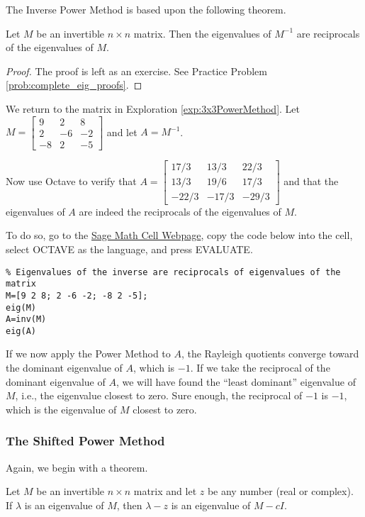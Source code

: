 \documentclass{ximera}
\begin{document}
The Inverse Power Method is based upon the following theorem.

\begin{theorem}\label{th:eig_inverse}
Let $M$ be an invertible $n \times n$ matrix.  Then the eigenvalues of $M^{-1}$ are reciprocals of the eigenvalues of $M$.
\end{theorem}

\begin{proof}
The proof is left as an exercise.  See Practice Problem \ref{prob:complete_eig_proofs}.
\end{proof}

We return to the matrix in Exploration \ref{exp:3x3PowerMethod}.  Let $M=\left[ \begin{array}{rrr}
9 & 2 & 8 \\
2 & -6 & -2 \\
-8 & 2 & -5
\end{array}\right]$ and let $A=M^{-1}$.  

Now use Octave to verify that $A=\left[ \begin{array}{rrr}
17/3 & 13/3 & 22/3 \\
13/3 & 19/6 & 17/3 \\
-22/3 & -17/3 & -29/3
\end{array}\right]$ and that the eigenvalues of $A$ are indeed the reciprocals of the eigenvalues of $M$.

To do so, go to the \href{https://sagecell.sagemath.org/}{Sage Math Cell Webpage}, copy the code below into the cell, select OCTAVE as the language, and press EVALUATE.
\begin{verbatim}
% Eigenvalues of the inverse are reciprocals of eigenvalues of the matrix
M=[9 2 8; 2 -6 -2; -8 2 -5];
eig(M)
A=inv(M)
eig(A)
\end{verbatim}

If we now apply the Power Method to $A$, the Rayleigh quotients converge toward the dominant eigenvalue of $A$, which is $-1$.  If we take the reciprocal of the dominant eigenvalue of $A$, we will have found the ``least dominant'' eigenvalue of $M$, i.e., the eigenvalue closest to zero.  Sure enough, the reciprocal of $-1$ is $-1$, which is the eigenvalue of $M$ closest to zero.


\subsubsection*{The Shifted Power Method}
Again, we begin with a theorem.

\begin{theorem}\label{th:eig_shifted}
Let $M$ be an invertible $n \times n$ matrix and let $z$ be any number (real or complex).  If $\lambda$ is an eigenvalue of $M$, then $\lambda - z$ is an eigenvalue of $M - cI$.
\end{theorem}
\end{document}
